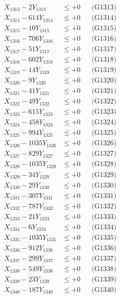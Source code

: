 \documentclass[a4paper,10pt]{article}
\begin{document}
{\begin{align}
X_{1313} - 2Y_{1313} &\leq +0 && \text{(G1313)} \\
X_{1314} - 614Y_{1314} &\leq +0 && \text{(G1314)} \\
X_{1315} - 10Y_{1315} &\leq +0 && \text{(G1315)} \\
X_{1316} - 706Y_{1316} &\leq +0 && \text{(G1316)} \\
X_{1317} - 51Y_{1317} &\leq +0 && \text{(G1317)} \\
X_{1318} - 602Y_{1318} &\leq +0 && \text{(G1318)} \\
X_{1319} - 14Y_{1319} &\leq +0 && \text{(G1319)} \\
X_{1320} - 9Y_{1320} &\leq +0 && \text{(G1320)} \\
\allowbreak
X_{1321} - 41Y_{1321} &\leq +0 && \text{(G1321)} \\
X_{1322} - 49Y_{1322} &\leq +0 && \text{(G1322)} \\
X_{1323} - 615Y_{1323} &\leq +0 && \text{(G1323)} \\
X_{1324} - 458Y_{1324} &\leq +0 && \text{(G1324)} \\
X_{1325} - 994Y_{1325} &\leq +0 && \text{(G1325)} \\
X_{1326} - 1035Y_{1326} &\leq +0 && \text{(G1326)} \\
X_{1327} - 829Y_{1327} &\leq +0 && \text{(G1327)} \\
X_{1328} - 1035Y_{1328} &\leq +0 && \text{(G1328)} \\
X_{1329} - 34Y_{1329} &\leq +0 && \text{(G1329)} \\
X_{1330} - 29Y_{1330} &\leq +0 && \text{(G1330)} \\
\allowbreak
X_{1331} - 307Y_{1331} &\leq +0 && \text{(G1331)} \\
X_{1332} - 787Y_{1332} &\leq +0 && \text{(G1332)} \\
X_{1333} - 21Y_{1333} &\leq +0 && \text{(G1333)} \\
X_{1334} - 6Y_{1334} &\leq +0 && \text{(G1334)} \\
X_{1335} - 1035Y_{1335} &\leq +0 && \text{(G1335)} \\
X_{1336} - 912Y_{1336} &\leq +0 && \text{(G1336)} \\
X_{1337} - 299Y_{1337} &\leq +0 && \text{(G1337)} \\
X_{1338} - 549Y_{1338} &\leq +0 && \text{(G1338)} \\
X_{1339} - 23Y_{1339} &\leq +0 && \text{(G1339)} \\
X_{1340} - 187Y_{1340} &\leq +0 && \text{(G1340)} \\

\end{align}}
\end{document}
